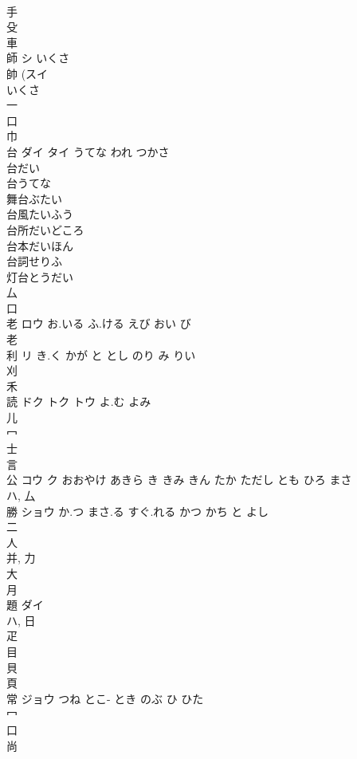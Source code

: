 \documentclass[8pt]{extreport}
\begin{document}
\begin{CJK}{UTF8}{min}
\\	手 
\\	殳 
\\	車 
\\	師	シ	いくさ	
\\	帥 (スイ 
\\	いくさ 
\\	一 
\\	口 
\\	巾 
\\	台	ダイ タイ	うてな われ つかさ	
\\	台だい
\\	台うてな
\\	舞台ぶたい
\\	台風たいふう
\\	台所だいどころ
\\	台本だいほん
\\	台詞せりふ
\\	灯台とうだい
\\	厶 
\\	口 
\\	老	ロウ	お.いる ふ.ける えび おい び	
\\	老 
\\	利	リ	き.く かが と とし のり み りい	
\\	刈 
\\	禾 
\\	読	ドク トク トウ	よ.む よみ	
\\	儿 
\\	冖 
\\	士 
\\	言 
\\	公	コウ ク	おおやけ あきら き きみ きん たか ただし とも ひろ まさ	
\\	ハ, 厶 
\\	勝	ショウ	か.つ まさ.る すぐ.れる かつ かち と よし	
\\	二 
\\	人 
\\	并, 力 
\\	大 
\\	月 
\\	題	ダイ		
\\	ハ, 日 
\\	疋 
\\	目 
\\	貝 
\\	頁 
\\	常	ジョウ	つね とこ- とき のぶ ひ ひた	
\\	冖 
\\	口 
\\	尚 

\end{CJK}
\end{document}
